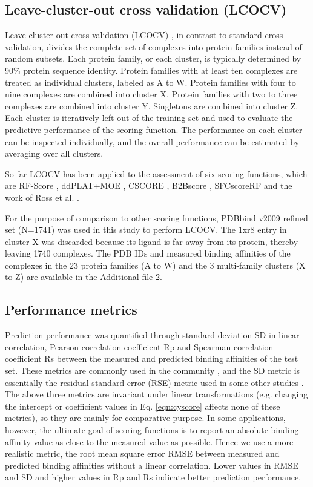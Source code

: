 \documentclass[linenumbers]{bmcart}
\begin{document}
\subsection*{Leave-cluster-out cross validation (LCOCV)}

Leave-cluster-out cross validation (LCOCV) \cite{774}, in contrast to standard cross validation, divides the complete set of complexes into protein families instead of random subsets. Each protein family, or each cluster, is typically determined by 90\% protein sequence identity. Protein families with at least ten complexes are treated as individual clusters, labeled as A to W. Protein families with four to nine complexes are combined into cluster X. Protein families with two to three complexes are combined into cluster Y. Singletons are combined into cluster Z. Each cluster is iteratively left out of the training set and used to evaluate the predictive performance of the scoring function. The performance on each cluster can be inspected individually, and the overall performance can be estimated by averaging over all clusters.

So far LCOCV has been applied to the assessment of six scoring functions, which are RF-Score \cite{774,1194,1410}, ddPLAT+MOE \cite{1414}, CSCORE \cite{1194}, B2Bscore \cite{1410}, SFCscoreRF \cite{1347} and the work of Ross et al. \cite{1415}.

For the purpose of comparison to other scoring functions, PDBbind v2009 refined set (N=1741) was used in this study to perform LCOCV. The 1xr8 entry in cluster X was discarded because its ligand is far away from its protein, thereby leaving 1740 complexes. The PDB IDs and measured binding affinities of the complexes in the 23 protein families (A to W) and the 3 multi-family clusters (X to Z) are available in the Additional file 2.

\subsection*{Performance metrics}

Prediction performance was quantified through standard deviation SD in linear correlation, Pearson correlation coefficient Rp and Spearman correlation coefficient Rs between the measured and predicted binding affinities of the test set. These metrics are commonly used in the community \cite{1313}, and the SD metric is essentially the residual standard error (RSE) metric used in some other studies \cite{963}. The above three metrics are invariant under linear transformations (e.g. changing the intercept or coefficient values in Eq. \ref{eqn:cyscore} affects none of these metrics), so they are mainly for comparative purpose. In some applications, however, the ultimate goal of scoring functions is to report an absolute binding affinity value as close to the measured value as possible. Hence we use a more realistic metric, the root mean square error RMSE between measured and predicted binding affinities without a linear correlation. Lower values in RMSE and SD and higher values in Rp and Rs indicate better prediction performance.
\end{document}
